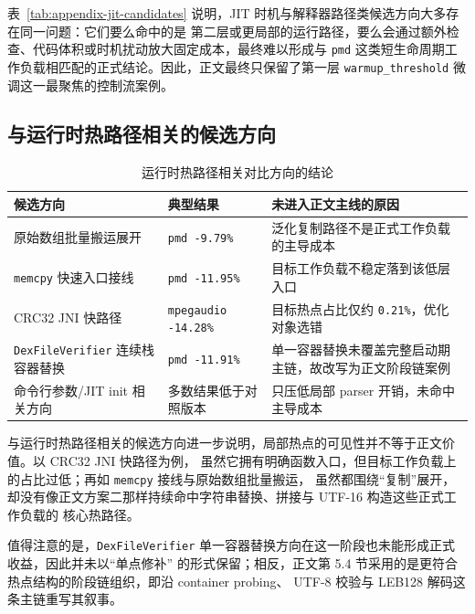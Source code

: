 表~\ref{tab:appendix-jit-candidates} 说明，JIT 时机与解释器路径类候选方向大多存在同一问题：它们要么命中的是
第二层或更局部的运行路径，要么会通过额外检查、代码体积或时机扰动放大固定成本，最终难以形成与
\texttt{pmd} 这类短生命周期工作负载相匹配的正式结论。因此，正文最终只保留了第一层
\texttt{warmup\_threshold} 微调这一最聚焦的控制流案例。

\subsection{与运行时热路径相关的候选方向}

\begin{table}[htbp]
    \centering
    \small
    \caption{运行时热路径相关对比方向的结论}
    \label{tab:appendix-runtime-candidates}
    \begin{tabular}{>{\raggedright\arraybackslash}p{4.0cm}>{\raggedright\arraybackslash}p{2.2cm}>{\raggedright\arraybackslash}p{4.8cm}}
        \hline
        \textbf{候选方向} & \textbf{典型结果} & \textbf{未进入正文主线的原因} \\
        \hline
        原始数组批量搬运展开 & \texttt{pmd -9.79\%} & 泛化复制路径不是正式工作负载的主导成本 \\
        \texttt{memcpy} 快速入口接线 & \texttt{pmd -11.95\%} & 目标工作负载不稳定落到该低层入口 \\
        CRC32 JNI 快路径 & \texttt{mpegaudio -14.28\%} & 目标热点占比仅约 \texttt{0.21\%}，优化对象选错 \\
        \texttt{DexFileVerifier} 连续栈容器替换 & \texttt{pmd -11.91\%} & 单一容器替换未覆盖完整启动期主链，故改写为正文阶段链案例 \\
        命令行参数/JIT init 相关方向 & 多数结果低于对照版本 & 只压低局部 parser 开销，未命中主导成本 \\
        \hline
    \end{tabular}
\end{table}

与运行时热路径相关的候选方向进一步说明，局部热点的可见性并不等于正文价值。以 CRC32 JNI 快路径为例，
虽然它拥有明确函数入口，但目标工作负载上的占比过低；再如 \texttt{memcpy} 接线与原始数组批量搬运，
虽然都围绕“复制”展开，却没有像正文方案二那样持续命中字符串替换、拼接与 UTF-16 构造这些正式工作负载的
核心热路径。

值得注意的是，\texttt{DexFileVerifier} 单一容器替换方向在这一阶段也未能形成正式收益，因此并未以“单点修补”
的形式保留；相反，正文第 5.4 节采用的是更符合热点结构的阶段链组织，即沿 container probing、
UTF-8 校验与 LEB128 解码这条主链重写其叙事。


